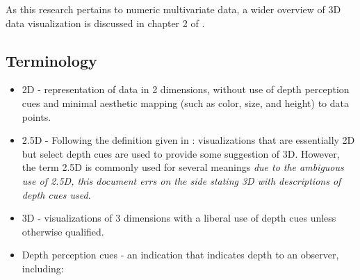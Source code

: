 \documentclass{monashthesis}
\begin{document}
As this research pertains to numeric multivariate data, a wider overview
of 3D data visualization is discussed in chapter 2 of
\textcite{marriott_immersive_2018}.

\subsection{Terminology}\label{sec:3d-terminology}

\begin{itemize}
\tightlist
\item
  2D - representation of data in 2 dimensions, without use of depth
  perception cues and minimal aesthetic mapping (such as color, size,
  and height) to data points.
\item
  2.5D - Following the definition given in
  \textcite{ware_designing_2000}: visualizations that are essentially 2D
  but select depth cues are used to provide some suggestion of 3D.
  However, the term 2.5D is commonly used for several meanings \emph{due
  to the ambiguous use of 2.5D, this document errs on the side stating
  3D with descriptions of depth cues used}.
\item
  3D - visualizations of 3 dimensions with a liberal use of depth cues
  unless otherwise qualified.
\item
  Depth perception cues - an indication that indicates depth to an
  observer, including:


\end{itemize}
\end{document}
